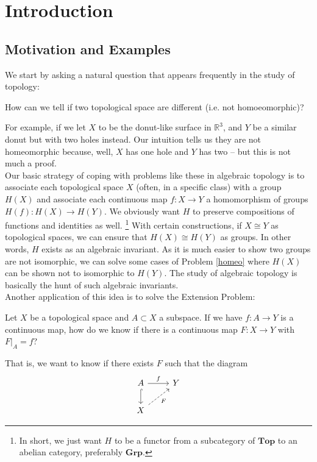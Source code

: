 \section{Introduction}
\subsection{Motivation and Examples}
We start by asking a natural question that appears frequently in the study of topology:
\begin{problem}\label{homeo}
    How can we tell if two topological space are different (i.e. not homoeomorphic)?
\end{problem}
For example, if we let $X$ to be the donut-like surface in $\mathbb R^3$, and $Y$ be a similar donut but with two holes instead.
Our intuition tells us they are not homeomorphic because, well, $X$ has one hole and $Y$ has two -- but this is not much a proof.\\
Our basic strategy of coping with problems like these in algebraic topology is to associate each topological space $X$ (often, in a specific class) with a group $H(X)$ and associate each continuous map $f:X\to Y$ a homomorphism of groups $H(f):H(X)\to H(Y)$.
We obviously want $H$ to preserve compositions of functions and identities as well.
\footnote{In short, we just want $H$ to be a functor from a subcategory of $\mathbf{Top}$ to an abelian category, preferably $\mathbf{Grp}$.}
With certain constructions, if $X\cong Y$ as topological spaces, we can ensure that $H(X)\cong H(Y)$ as groups.
In other words, $H$ exists as an algebraic invariant.
As it is much easier to show two groups are not isomorphic, we can solve some cases of Problem \ref{homeo} where $H(X)$ can be shown not to isomorphic to $H(Y)$.
The study of algebraic topology is basically the hunt of such algebraic invariants.\\
Another application of this idea is to solve the Extension Problem:
\begin{problem}
    Let $X$ be a topological space and $A\subset X$ a subspace.
    If we have $f:A\to Y$ is a continuous map, how do we know if there is a continuous map $F:X\to Y$ with $F|_A=f$?
\end{problem}
That is, we want to know if there exists $F$ such that the diagram
\[
    \begin{tikzcd}
        A \arrow[hookrightarrow]{d} \arrow{r}{f} & Y\\
        X \arrow[dashed,swap]{ur}{F}&
    \end{tikzcd}
\]
